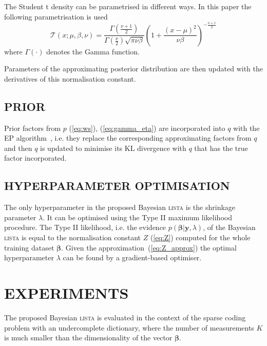 \documentclass[letterpaper]{article}
\begin{document}
The Student t density can be parametrised in different ways. In this paper the following parametrisation is used
\begin{equation}
\mathcal{T}(x; \mu, \beta, \nu) = \frac{\Gamma\left(\frac{\nu + 1}{2}\right)}{\Gamma\left(\frac{\nu}{2}\right)\sqrt{\pi \nu \beta}} \left(1 + \frac{(x - \mu)^2}{\nu\beta}\right)^{-\frac{\nu + 1}{2}}
\end{equation}
where $\Gamma(\cdot)$ denotes the Gamma function.

Parameters of the approximating posterior distribution are then updated with the derivatives of this normalisation constant.

\subsection{\uppercase{Prior}}
Prior factors from $p$ (\ref{eq:ws}), (\ref{eq:gamma_eta}) are incorporated into $q$ with the EP algorithm~\citep{hernandez2015probabilistic}, i.e. they replace the corresponding approximating factors from $q$ and then $q$ is updated to minimise its KL divergence with $q$ that has the true factor incorporated.

\subsection{\uppercase{Hyperparameter optimisation}}
The only hyperparameter in the proposed Bayesian \textsc{lista} is the shrinkage parameter $\lambda$. It can be optimised using the Type II maximum likelihood procedure. The Type II likelihood, i.e. the evidence $p(\boldsymbol\beta | \mathbf{y}, \lambda)$, of the Bayesian \textsc{lista} is equal to the normalisation constant $Z$ (\ref{eq:Z}) computed for the whole training dataset $\boldsymbol\beta$. Given the approximation~(\ref{eq:Z_approx}) the optimal hyperparameter $\lambda$ can be found by a gradient-based optimiser.

\section{\uppercase{Experiments}}
\label{sec:experiments}
The proposed Bayesian \textsc{lista} is evaluated in the context of the sparse coding problem with an undercomplete dictionary, where the number of measurements $K$ is much smaller than the dimensionality of the vector $\boldsymbol\beta$.
\end{document}
